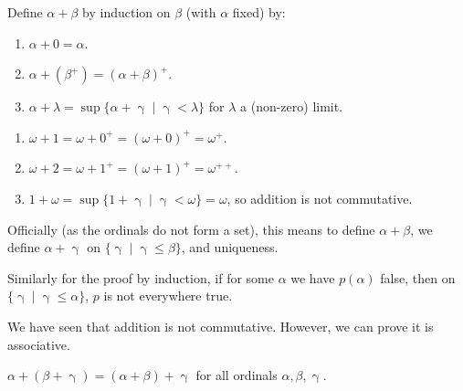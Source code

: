 \documentclass[12pt]{article}
\begin{document}
Define $\alpha + \beta$ by induction on $\beta$ (with $\alpha$ fixed) by:
\begin{enumerate}
	\item $\alpha + 0 = \alpha$.
	\item $\alpha + (\beta^{+}) = (\alpha + \beta)^{+}$.
	\item $\alpha + \lambda = \sup \{\alpha + \upgamma \mid \upgamma < \lambda\}$ for $\lambda$ a (non-zero) limit.
\end{enumerate}

\begin{exbox}
	\begin{enumerate}
		\item $\omega + 1 = \omega + 0^{+} = (\omega + 0)^{+} = \omega^{+}$.
		\item $\omega + 2 = \omega + 1^{+} = (\omega + 1)^{+} =\omega^{++}$.
		\item $1 + \omega = \sup\{1 + \upgamma \mid \upgamma < \omega\} = \omega$, so addition is not commutative.
	\end{enumerate}
\end{exbox}

\begin{remark}
	Officially (as the ordinals do not form a set), this means to define $\alpha + \beta$, we define $\alpha + \upgamma$ on $\{\upgamma \mid \upgamma \leq \beta\}$, and uniqueness.

	Similarly for the proof by induction, if for some $\alpha$ we have $p(\alpha)$ false, then on $\{\upgamma \mid \upgamma \leq \alpha\}$, $p$ is not everywhere true.
\end{remark}

We have seen that addition is not commutative. However, we can prove it is associative.

\begin{proposition}
	$\alpha + (\beta + \upgamma) = (\alpha + \beta) + \upgamma$ for all ordinals $\alpha, \beta, \upgamma$.
\end{proposition}
\end{document}
